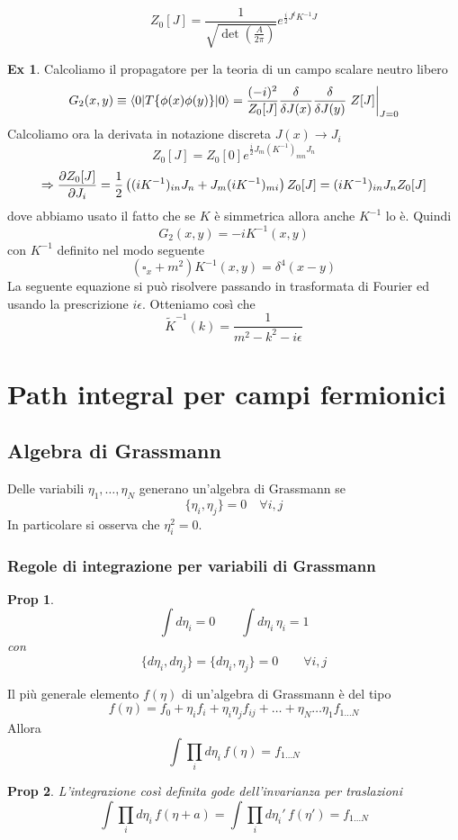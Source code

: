 \documentclass[10pt,a4paper]{article}
\newtheorem{prop}{Prop}[section]
\theoremstyle{definition}
\newtheorem{example}{Ex}[section]
\begin{document}
\[
Z_0[J] = \frac{1}{\sqrt{\det\left(\frac{A}{2\pi}\right)}}e^{\frac{i}{2}J^t K^{-1}J}    
\]
\begin{example}
    Calcoliamo il propagatore per la teoria di un campo scalare neutro libero
    \[
    G_2(x, y) \equiv \ev**{T\{\phi(x)\phi(y)\}}{0} = \frac{(-i)^2}{Z_0[J]}\fdv{J(x)}\fdv{J(y)}\eval{Z[J]}_{J=0}    
    \]
    Calcoliamo ora la derivata in notazione discreta \(J(x) \to J_i\)
    \[
    Z_0[J] = Z_0[0]e^{\frac{i}{2}J_m(K^{-1})_{mn}J_n}    
    \]
    \[
        \Rightarrow \pdv{Z_0[J]}{J_i} = \frac12  \left((iK^{-1})_{in}J_n + J_m(iK^{-1})_{mi} \right)Z_0[J] = (iK^{-1})_{in}J_nZ_0[J]
    \]
    dove abbiamo usato il fatto che se $K$ è simmetrica allora anche $K^{-1}$ lo è. Quindi
    \[
    G_2(x, y) = -i K^{-1}(x, y)    
    \]
    con $K^{-1}$ definito nel modo seguente
    \[
    (\square_x + m^2)K^{-1}(x,y) = \delta^4(x - y)    
    \]
    La seguente equazione si può risolvere passando in trasformata di Fourier ed usando la prescrizione $i\epsilon$. Otteniamo così che
    \[
    \tilde{K}^{-1}(k) = \frac{1}{m^2 - k^2 - i\epsilon}    
    \]
\end{example}
\section{Path integral per campi fermionici}
\subsection{Algebra di Grassmann}
Delle variabili $\eta_1,\dots, \eta_N$ generano un'algebra di Grassmann se
\[
\{\eta_i, \eta_j\} = 0\quad \forall i, j    
\]
In particolare si osserva che $\eta_i^2 = 0$.
\subsubsection{Regole di integrazione per variabili di Grassmann}
\begin{prop}
    \[
    \int d\eta_i = 0 \qquad \int d\eta_i\, \eta_i = 1    
    \]
    con
    \[
       \{d\eta_i, d\eta_j\} = \{d\eta_i, \eta_j\} = 0 \qquad \forall i, j 
    \]
\end{prop}
Il più generale elemento $f(\eta)$ di un'algebra di Grassmann è del tipo
\[
f(\eta) = f_0 + \eta_i f_i + \eta_i \eta_j f_{ij} + \dots + \eta_N \dots \eta_1 f_{1 \dots N }    
\]
Allora
\[
\int \prod_i d\eta_i \, f(\eta) = f_{1 \dots N}    
\]
\begin{prop}
    L'integrazione così definita gode dell'invarianza per traslazioni
    \[
    \int \prod_i d\eta_i \, f(\eta + a) = \int \prod_i d\eta_i'\, f(\eta') = f_{1 \dots N}     
    \]
\end{prop}
\end{document}
